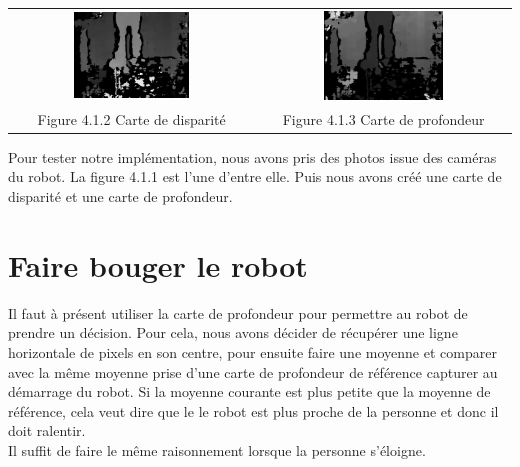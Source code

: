 \documentclass[12pt,a4paper]{report}
\begin{document}
\begin{center}
\begin{tabular}{cc}
  \vspace{0pt} \includegraphics[width=0.49\textwidth]{Carte_de_disparite.png} &
  \vspace{0pt} \includegraphics[width=0.49\textwidth]{Carte_de_profondeur.png} \\
    
	Figure 4.1.2 Carte de disparité & Figure 4.1.3 Carte de profondeur
\end{tabular}
\end{center}

Pour tester notre implémentation, nous avons pris des photos issue des caméras du robot. La figure 4.1.1 est l'une d'entre elle. Puis nous avons créé une carte de disparité et une carte de profondeur. 

\section{Faire bouger le robot}
Il faut à présent utiliser la carte de profondeur pour permettre au robot de prendre un décision. Pour cela, nous avons décider de récupérer une ligne horizontale de pixels en son centre, pour ensuite faire une moyenne et comparer avec la même moyenne prise d'une carte de profondeur de référence capturer au démarrage du robot. Si la moyenne courante est plus petite que la moyenne de référence, cela veut dire que le le robot est plus proche de la personne et donc il doit ralentir.\\
Il suffit de faire le même raisonnement lorsque la personne s'éloigne.\\
\end{document}
